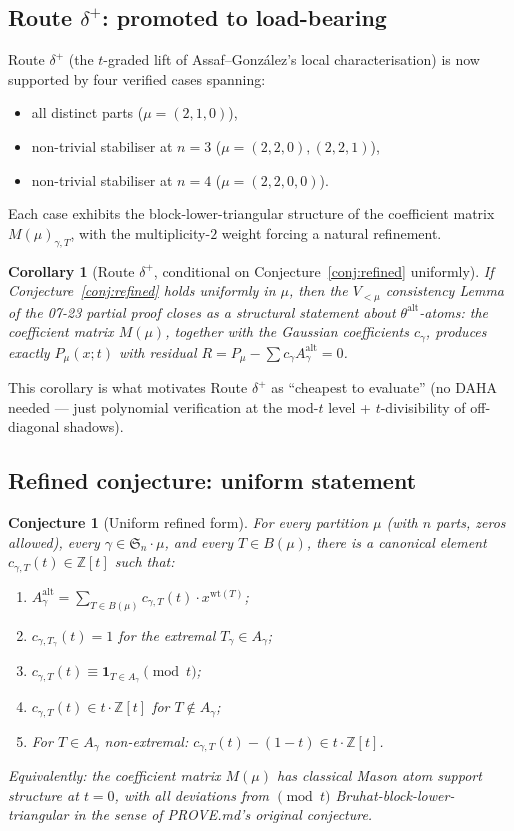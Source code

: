 \documentclass[11pt]{article}
\newtheorem{conjecture}[theorem]{Conjecture}
\newtheorem{corollary}[theorem]{Corollary}
\theoremstyle{definition}
\theoremstyle{remark}
\newcommand{\Aalt}{A^{\mathrm{alt}}}
\newcommand{\thetaalt}{\theta^{\mathrm{alt}}}
\newcommand{\wt}{\mathrm{wt}}
\newcommand{\Sn}{\mathfrak{S}_n}
\newcommand{\ZZ}{\mathbb{Z}}
\begin{document}
\subsection{Route $\delta^+$: promoted to load-bearing}

Route $\delta^+$ (the $t$-graded lift of Assaf--Gonz\'alez's local
characterisation) is now supported by four verified cases spanning:
\begin{itemize}
   \item all distinct parts ($\mu = (2,1,0)$),
   \item non-trivial stabiliser at $n = 3$ ($\mu = (2,2,0), (2,2,1)$),
   \item non-trivial stabiliser at $n = 4$ ($\mu = (2,2,0,0)$).
\end{itemize}
Each case exhibits the block-lower-triangular structure of the
coefficient matrix $M(\mu)_{\gamma, T}$, with the multiplicity-$2$
weight forcing a natural refinement.

\begin{corollary}[Route $\delta^+$, conditional on Conjecture~\ref{conj:refined} uniformly]
If Conjecture~\ref{conj:refined} holds uniformly in $\mu$, then the
$V_{<\mu}$ consistency Lemma of the 07-23 partial proof closes as a
structural statement about $\thetaalt$-atoms: the coefficient matrix
$M(\mu)$, together with the Gaussian coefficients
$c_\gamma$, produces exactly $P_\mu(x;t)$ with residual
$R = P_\mu - \sum c_\gamma \Aalt_\gamma = 0$.
\end{corollary}

This corollary is what motivates Route $\delta^+$ as ``cheapest to
evaluate'' (no DAHA needed --- just polynomial verification at the
mod-$t$ level + $t$-divisibility of off-diagonal shadows).

\subsection{Refined conjecture: uniform statement}

\begin{conjecture}[Uniform refined form]
\label{conj:uniform}
For every partition $\mu$ (with $n$ parts, zeros allowed), every
$\gamma \in \Sn \cdot \mu$, and every $T \in B(\mu)$, there is a
canonical element $c_{\gamma, T}(t) \in \ZZ[t]$ such that:
\begin{enumerate}
   \item $\Aalt_\gamma = \sum_{T \in B(\mu)} c_{\gamma, T}(t) \cdot x^{\wt(T)}$;
   \item $c_{\gamma, T_\gamma}(t) = 1$ for the extremal $T_\gamma \in A_\gamma$;
   \item $c_{\gamma, T}(t) \equiv \mathbf{1}_{T \in A_\gamma} \pmod{t}$;
   \item $c_{\gamma, T}(t) \in t \cdot \ZZ[t]$ for $T \notin A_\gamma$;
   \item For $T \in A_\gamma$ non-extremal: $c_{\gamma, T}(t) - (1-t) \in t \cdot \ZZ[t]$.
\end{enumerate}
Equivalently: the coefficient matrix $M(\mu)$ has classical Mason atom
support structure at $t = 0$, with all deviations from $\pmod{t}$
Bruhat-block-lower-triangular in the sense of PROVE.md's original
conjecture.
\end{conjecture}
\end{document}
